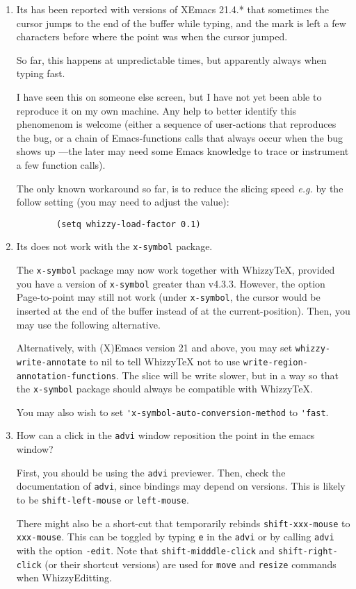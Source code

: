 \documentclass{article}
\let \lst \verb
\begin{document}
\begin {enumerate}

\item
Its has been reported with versions of \textsf{XEmacs 21.4.*} that sometimes
the cursor jumps to the end of the buffer while typing, and the mark is left
a few characters before where the point was when the cursor jumped.

So far, this happens at unpredictable times, but apparently always when
typing fast.

I have seen this on someone else screen, but I have not yet been able to
reproduce it on my own machine. Any help to better identify this phenomenom
is welcome (either a sequence of user-actions that reproduces the bug, or a
chain of Emacs-functions calls that always occur when the bug shows up
---the later may need some Emacs knowledge to trace or instrument a few
function calls).

The only known workaround so far, is to reduce the slicing speed \emph{e.g.}
by the follow setting (you may need to adjust the value):
\begin{verbatim}
        (setq whizzy-load-factor 0.1)
\end{verbatim}


\item Its does not work with the  \lst"x-symbol" package.

The \lst"x-symbol" package may now work together with WhizzyTeX, provided
you have a version of {\tt x-symbol} greater than v4.3.3.  However, the
option Page-to-point may still not work (under \lst"x-symbol", the cursor
would be inserted at the end of the buffer instead of at the
current-position).  Then, you may use the following alternative.

Alternatively, with (X)Emacs version 21 and above, you may set
\lst"whizzy-write-annotate" to nil to tell WhizzyTeX not to use
\lst"write-region-annotation-functions". The slice will be write slower, but
in a way so that the \lst"x-symbol" package should always be compatible with 
WhizzyTeX. 

You may also wish to set \lst"'x-symbol-auto-conversion-method" to
\lst"'fast".

\item How can a click in the \lst"advi" window reposition the point
in the emacs window?

First, you should be using the \lst"advi" previewer.  Then, check the
documentation of \lst"advi", since bindings may depend on versions. This is
likely to be \lst"shift-left-mouse" or \lst"left-mouse".

There might also be a short-cut that temporarily rebinds
\lst"shift-xxx-mouse" to \lst"xxx-mouse". This can be toggled by typing
\lst"e"   in the \lst"advi" or by calling \lst"advi" with the option
\lst"-edit". 
%
Note that \lst"shift-midddle-click" and \lst"shift-right-click" (or their
shortcut versions) are used for \lst"move" and \lst"resize" commands when
WhizzyEditting.


\end {enumerate}
\end{document}
